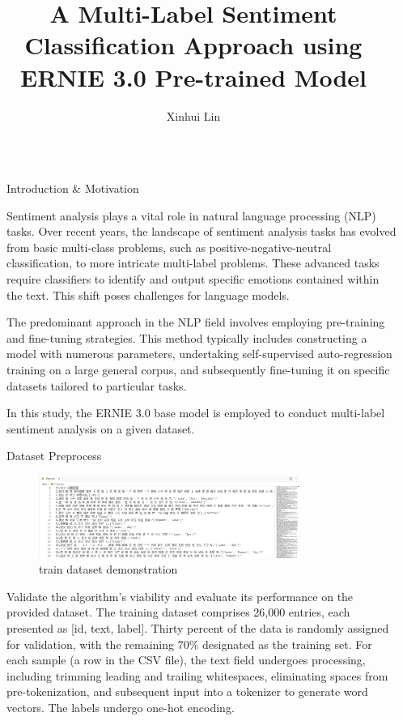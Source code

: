 \documentclass[final]{beamer}
\title{A Multi-Label Sentiment Classification Approach using ERNIE 3.0 Pre-trained Model}
\author{Xinhui Lin}
\institute[shortinst]{School of Computer Science and Engineering, Northeastern University}
\newlength{\sepwidth}
\newlength{\colwidth}
\newcommand{\separatorcolumn}{\begin{column}{\sepwidth}\end{column}}
\begin{document}
\begin{frame}[t]
\begin{columns}[t]
\separatorcolumn

\begin{column}{\colwidth}

\begin{block}{Introduction \& Motivation}

    Sentiment analysis plays a vital role in natural language processing (NLP) tasks. Over recent years, the landscape of sentiment analysis tasks has evolved from basic multi-class problems, such as positive-negative-neutral classification, to more intricate multi-label problems. These advanced tasks require classifiers to identify and output specific emotions contained within the text. This shift poses challenges for language models.

The predominant approach in the NLP field involves employing pre-training and fine-tuning strategies. This method typically includes constructing a model with numerous parameters, undertaking self-supervised auto-regression training on a large general corpus, and subsequently fine-tuning it on specific datasets tailored to particular tasks.

In this study, the ERNIE 3.0 base model is employed to conduct multi-label sentiment analysis on a given dataset.

  \end{block}
  
  \begin{block}{Dataset Preprocess}

      \begin{figure}
        \centering
        \includegraphics[width=0.8\textwidth]{logos/2024-01-01_21-35.png}
        \caption{train dataset demonstration}
        \label{fig: ERNIE 3.0 framework}
    \end{figure}

  Validate the algorithm's viability and evaluate its performance on the provided dataset. The training dataset comprises 26,000 entries, each presented as [id, text, label]. Thirty percent of the data is randomly assigned for validation, with the remaining 70\% designated as the training set. For each sample (a row in the CSV file), the text field undergoes processing, including trimming leading and trailing whitespaces, eliminating spaces from pre-tokenization, and subsequent input into a tokenizer to generate word vectors. The labels undergo one-hot encoding.


\end{block}
\end{column}
\end{columns}
\end{frame}
\end{document}
